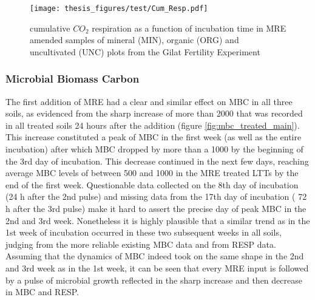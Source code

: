 \documentclass[12pt]{report}
\begin{document}
		
		\begin{figure}[H]
			\centering
			\texttt{[image: thesis\_figures/test/Cum\_Resp.pdf]}
			\caption{cumulative $CO_2$ respiration  as a function of incubation time in MRE amended samples of mineral (MIN), organic (ORG) and uncultivated (UNC) plots from the Gilat Fertility Experiment}
			\label{fig:cum_resp_treated_main}
		\end{figure}
		
		\subsubsection{Microbial Biomass Carbon}
		The first addition of MRE had a clear and similar effect on MBC in all three soils, as evidenced from the sharp increase of more than 2000 \genericunit that was recorded in all treated soils 24 hours after the addition (figure \ref{fig:mbc_treated_main}). This increase constituted a peak of MBC in the first ­week (as well as the entire incubation) after which MBC dropped by more than a 1000 \genericunit by the beginning of the 3rd day of incubation. This decrease continued in the next few days, reaching average MBC levels of between 500 and 1000 \genericunit in the MRE treated LTTs by the end of the first week. Questionable data collected on the 8th day of incubation (24 h after the 2nd pulse) and missing data from the 17th day of incubation ( 72 h after the 3rd pulse)  make it hard to assert the precise day of peak MBC in the 2nd and 3rd  week. Nonetheless it is highly plausible that a similar trend as in the 1st week of incubation occurred in these two subsequent weeks in all soils, judging from  the more reliable existing MBC data and from RESP data. Assuming that the dynamics of MBC indeed took on the same shape in the 2nd and 3rd week as in the 1st week, it can be seen that every MRE input is followed by a pulse of microbial growth reflected in the sharp increase and then decrease in MBC and RESP.\\
		
		
		
\end{document}
